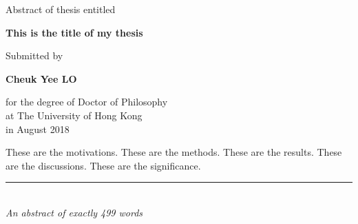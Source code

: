 {}

\begin{center}

Abstract of thesis entitled\\

\bigskip

    \huge\textbf{This is the title of my thesis} \\

    \bigskip

    {\normalsize Submitted by}\\

\bigskip

    \Large{\textbf{Cheuk Yee LO}}\\

\bigskip

{\normalsize
for the degree of Doctor of Philosophy\\
at The University of Hong Kong\\
in August 2018\\}

\end{center}

\bigskip

These are the motivations.
These are the methods.
These are the results.
These are the discussions.
These are the significance.

\bigskip

\begin{center}

\rule{6cm}{0.025cm}\\
{\slshape An abstract of exactly 499 words}

\end{center}
